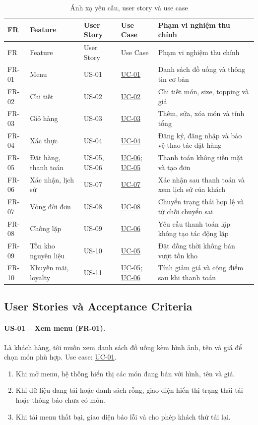 \begin{longtable}{@{}p{1.3cm}p{1.9cm}p{2.2cm}p{2.1cm}p{6.8cm}@{}}
\caption{Ánh xạ yêu cầu, user story và use case}\label{tab:story-traceability}\\
\toprule
FR & Feature & User Story & Use Case & Phạm vi nghiệm thu chính \\
\midrule
\endfirsthead
\toprule FR & Feature & User Story & Use Case & Phạm vi nghiệm thu chính \\
\midrule
\endhead
\bottomrule
\endfoot
FR-01 & Menu & US-01 & \hyperref[uc01]{UC-01} & Danh sách đồ uống và thông tin cơ bản \\
FR-02 & Chi tiết & US-02 & \hyperref[uc02]{UC-02} & Chi tiết món, size, topping và giá \\
FR-03 & Giỏ hàng & US-03 & \hyperref[uc03]{UC-03} & Thêm, sửa, xóa món và tính tổng \\
FR-04 & Xác thực & US-04 & \hyperref[uc04]{UC-04} & Đăng ký, đăng nhập và bảo vệ thao tác đặt hàng \\
FR-05 & Đặt hàng, thanh toán & US-05, US-06 & \hyperref[uc06]{UC-06}; \hyperref[uc05]{UC-05} & Thanh toán không tiền mặt và tạo đơn \\
FR-06 & Xác nhận, lịch sử & US-07 & \hyperref[uc07]{UC-07} & Xác nhận sau thanh toán và xem lịch sử của khách \\
FR-07 & Vòng đời đơn & US-08 & \hyperref[uc08]{UC-08} & Chuyển trạng thái hợp lệ và từ chối chuyển sai \\
FR-08 & Chống lặp & US-09 & \hyperref[uc06]{UC-06} & Yêu cầu thanh toán lặp không tạo tác động lặp \\
FR-09 & Tồn kho nguyên liệu & US-10 & \hyperref[uc05]{UC-05} & Đặt đồng thời không bán vượt tồn kho \\
FR-10 & Khuyến mãi, loyalty & US-11 & \hyperref[uc05]{UC-05}; \hyperref[uc06]{UC-06} & Tính giảm giá và cộng điểm sau khi thanh toán \\
\end{longtable}

\subsection{User Stories và Acceptance Criteria}

\paragraph{US-01 -- Xem menu (FR-01).}
Là khách hàng, tôi muốn xem danh sách đồ uống kèm hình ảnh, tên và giá để chọn món phù hợp. Use case: \hyperref[uc01]{UC-01}.
\begin{enumerate}[label=\textbf{AC\arabic*:},leftmargin=*]
  \item Khi mở menu, hệ thống hiển thị các món đang bán với hình, tên và giá.
  \item Khi dữ liệu đang tải hoặc danh sách rỗng, giao diện hiển thị trạng thái tải hoặc thông báo chưa có món.
  \item Khi tải menu thất bại, giao diện báo lỗi và cho phép khách thử tải lại.
\end{enumerate}

